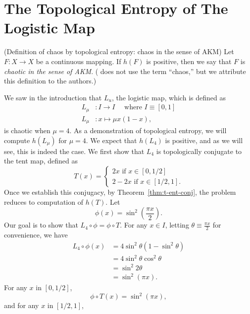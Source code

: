 \documentclass[12pt,twoside,draft]{book}
\begin{document}
\section{The Topological Entropy of The Logistic Map}
\begin{definition}
  (Definition of chaos by topological entropy: chaos in the sense of AKM) 
  Let $F: X \to X$ be a continuous mapping.
  If $h(F)$ is positive, then we say that $F$ is \textit{chaotic in the sense of AKM}.
  (\citet{akm} does not use the term ``chaos,'' but we attribute this definition to the authors.)
\end{definition}
We saw in the introduction that $L_u$, the logistic map, which is defined as
\begin{align*}
  L_\mu&: I \to I \quad\mbox{ where } I \equiv [0,1] \\
  L_\mu&: x \mapsto \mu x (1-x),
\end{align*}
is chaotic when $\mu = 4$.
As a demonstration of topological entropy, we will compute $h(L_\mu)$ for $\mu = 4$.
We expect that $h(L_4)$ is positive, and as we will see, this is indeed the case. 
We first show that $L_4$ is topologically conjugate to the tent map, defined as
\begin{equation*}
  T(x) = 
  \begin{cases}
    2x \mbox{ if } x \in [0,1/2] \\
    2 - 2x \mbox{ if } x \in [1/2,1].
  \end{cases}
\end{equation*}
Once we establish this conjugacy, by Theorem~\ref{thm:t-ent-conj}, the problem reduces to computation of $h(T)$.
Let
\begin{equation*}
  \phi(x) = \sin^2(\frac{\pi x}{2}).
\end{equation*}
Our goal is to show that $L_4 \circ \phi = \phi \circ T$.
For any $x \in I$, letting $\theta \equiv \frac{\pi x}{2}$ for convenience, we have
\begin{align*}
  L_4 \circ \phi(x)
  &= 4\sin^2\theta(1 - \sin^2\theta) \\
  &= 4\sin^2\theta \cos^2\theta \\
  &= \sin^2 2\theta \\
  &= \sin^2 (\pi x).
\end{align*}
For any $x$ in $[0,1/2]$,
\begin{equation*}
  \phi \circ T(x)
  = \sin^2(\pi x),
\end{equation*}
and for any $x$ in $[1/2,1]$,
\end{document}
